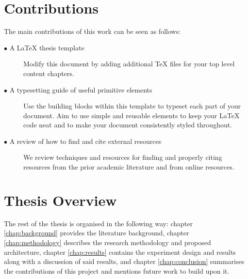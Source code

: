 \section{Contributions} 
	\label{sec:intro_contribs} 
	
	The main contributions of this work can be seen as follows:
	
	\begin{description}	
	
		\item[$\bullet$ A LaTeX thesis template]\hfill
		
		Modify this document by adding additional TeX files for your top level content chapters. 
		
		\item[$\bullet$ A typesetting guide of useful primitive elements]\hfill
		
		Use the building blocks within this template to typeset each part of your document. Aim to use simple and reusable elements to keep your LaTeX code neat and to make your document consistently styled throughout.
		
		\item[$\bullet$ A review of how to find and cite external resources]\hfill
					
		We review techniques and resources for finding and properly citing resources from the prior academic literature and from online resources.
		
	\end{description}
	
\section{Thesis Overview}

The rest of the thesis is organised in the following way: chapter \ref{chap:background} provides the literature background, chapter \ref{chap:methodology} describes the research methodology and proposed architecture, chapter \ref{chap:results} contains the experiment design and results along with a discussion of said results, and chapter \ref{chap:conclusion} summarises the contributions of this project and mentions future work to build upon it.
